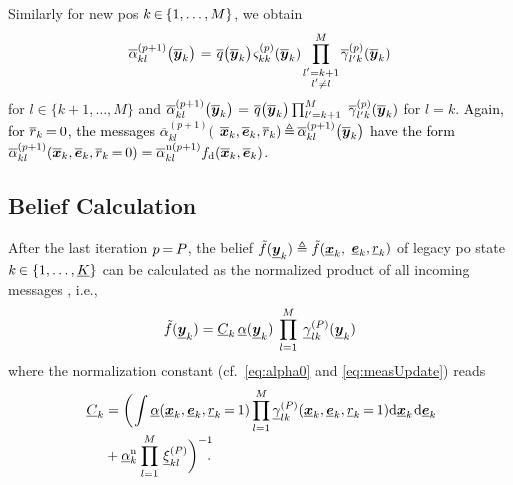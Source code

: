 \documentclass[10pt, twoside, romanappendices]{IEEEtran}
\providecommand{\rd}{\textcolor{black}}
\providecommand{\ist}{\hspace*{.3mm}}
\providecommand{\rmv}{\hspace*{-.3mm}}
\providecommand{\nn}{\nonumber}
\begin{document}
Similarly for new \acp{po} $k \rmv\in\rmv \{1,\dots,M\}$, we \vspace{.2mm} obtain
\begin{equation}
\overline{\alpha}_{kl}^{(p+1)}\big(\overline{\V{y}}_{k}\big) \ist=\ist \overline{q}\big(\overline{\V{y}}_{k}\big) \ist \varsigma_{kk}^{(p)}(\overline{\V{y}}_{k}) \hspace{-.2mm} \prod^{M}_{\substack{l'=k+1\\l' \neq l}} \hspace{-.2mm} \overline{\gamma}^{(p)}_{l'k}(\overline{\V{y}}_{k}) 
\label{eq:alphaUpdated2}
\vspace{.1mm}
\end{equation}
for $l \in \{k+1,\dots,M\}$ and $\overline{\alpha}_{kl}^{(p+1)}\big(\overline{\V{y}}_{k}\big) \ist=\ist \overline{q}\big(\overline{\V{y}}_{k}\big) \prod^{M}_{l'=k+1}$ $\overline{\gamma}^{(p)}_{l'k}(\overline{\bm{y}}_{k})$ for $l = k$. \rd{Again, for $ \overline{r}_{k} \rmv=\rmv 0$, the messages $\overline{\alpha}_{kl}^{(p+1)}($ $\overline{\V{x}}_{k},\overline{\V{e}}_{k}, \overline{r}_{k}) \rmv\triangleq\rmv  \overline{\alpha}_{kl}^{(p+1)}\big(\overline{\V{y}}_{k}\big)$ have the form $\overline{\alpha}_{kl}^{(p+1)} (\overline{\V{x}}_{k}, \overline{\V{e}}_{k}, \overline{r}_{k} \rmv=\rmv 0) = \overline{\alpha}^{\hspace{.15mm}\mathrm{n}(p+1)}_{kl} f_{\mathrm{d}}(\overline{\V{x}}_{k}, \overline{\V{e}}_{k})$.}



\subsection{Belief Calculation}
After the last iteration $p \rmv=\rmv P$, the belief $\tilde{f}(\underline{\bm{y}}_{k}) \triangleq \tilde{f}(\underline{\bm{x}}_{k},$ $\underline{\bm{e}}_{k},\underline{r}_{k})$ of legacy \ac{po} state $k \rmv\in \{1,\dots,\underline{K}\}$ can be calculated as the normalized product of all incoming messages \cite{KscFreLoe:01}, i.e.,
\begin{equation}
\tilde{f}(\underline{\V{y}}_{k}) = \underline{C}_k \ist\ist  \underline{\alpha}(\underline{\V{y}}_{k}) \ist\ist\ist \prod^{M}_{l=1} \ist\ist\ist \underline{\gamma}^{(P)}_{lk}(\underline{\V{y}}_{k}) \label{eq:beliefLegacy}
\vspace{0.2mm}
\end{equation}
where the normalization \vspace{-.3mm} constant (cf.~\eqref{eq:alpha0} and \eqref{eq:measUpdate}) reads
\begin{align}
\hspace{1mm}\underline{C}_k &= \bigg(\rmv\int \underline{\alpha}(\underline{\V{x}}_{k},\underline{\V{e}}_{k}, \underline{r}_{k} \rmv=\rmv 1) \prod^{M}_{l=1} \underline{\gamma}^{(P)}_{lk}(\underline{\V{x}}_{k},\underline{\V{e}}_{k}, \underline{r}_{k} \rmv=\rmv 1) \mathrm{d} \underline{\V{x}}_{k} \ist \mathrm{d} \underline{\V{e}}_{k} \nn\\[-1mm]
&+  \underline{\alpha}^{\mathrm{n}}_{k} \ist \prod^{M}_{l=1} \ist\ist  \underline{\xi}_{kl}^{(P)} \bigg)^{-1} \rmv\rmv\rmv\rmv\rmv.
\vspace{.8mm}
\label{eq:normConstant}
\end{align}
\end{document}
